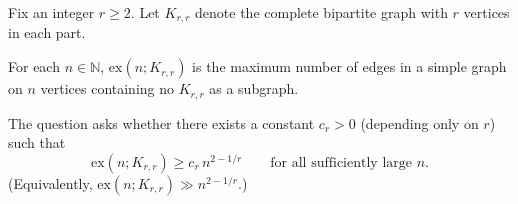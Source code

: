 Fix an integer $r\ge 2$. Let $K_{r,r}$ denote the complete bipartite graph with $r$ vertices in each part.

For each $n\in\mathbb N$, $\mathrm{ex}(n;K_{r,r})$ is the maximum number of edges in a simple graph on $n$ vertices containing no $K_{r,r}$ as a subgraph.

The question asks whether there exists a constant $c_r>0$ (depending only on $r$) such that
\[
\mathrm{ex}(n;K_{r,r}) \ge c_r\, n^{2-1/r}
\qquad\text{for all sufficiently large }n.
\]
(Equivalently, $\mathrm{ex}(n;K_{r,r})\gg n^{2-1/r}$.)
